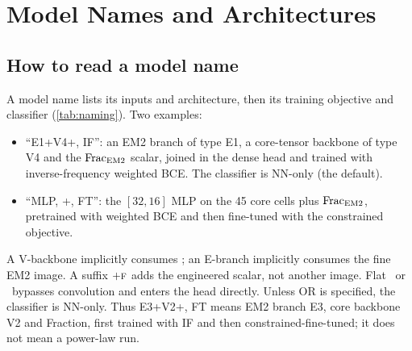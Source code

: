 \section{Model Names and Architectures}
\label{app:arch}

\subsection{How to read a model name}
\label{app:naming}
A model name lists its inputs and architecture, then its training objective and classifier (\cref{tab:naming}). Two examples:
\begin{itemize}
  \item ``E1+V4+\Ffeat, IF'': an EM2 branch of type E1, a core-tensor backbone of type V4 and the $\mathrm{Frac}_{\mathrm{EM2}}$ scalar, joined in the dense head and trained with inverse-frequency weighted BCE. The classifier is NN-only (the default).
  \item ``MLP, \CT+\Ffeat, FT'': the $[32,16]$ MLP on the 45 core cells plus $\mathrm{Frac}_{\mathrm{EM2}}$, pretrained with weighted BCE and then fine-tuned with the constrained objective.
\end{itemize}
A V-backbone implicitly consumes \CT; an E-branch implicitly consumes the fine EM2 image. A suffix $+\textsc{f}$ adds the engineered scalar, not another image. Flat \CT\ or \SUM\ bypasses convolution and enters the head directly. Unless OR is specified, the classifier is NN-only. Thus E3+V2+\Ffeat, FT means EM2 branch E3, core backbone V2 and Fraction, first trained with IF and then constrained-fine-tuned; it does not mean a power-law run.

